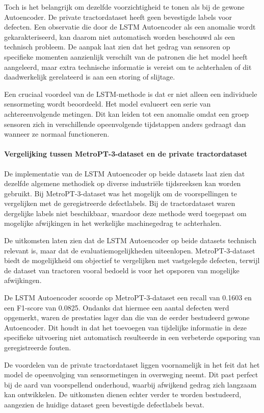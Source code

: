 {{{{Toch is het belangrijk om dezelfde voorzichtigheid te tonen als bij de gewone Autoencoder. De private tractordataset heeft geen bevestigde labels voor defecten. Een observatie die door de LSTM Autoencoder als een anomalie wordt gekarakteriseerd, kan daarom niet automatisch worden beschouwd als een technisch probleem. De aanpak laat zien dat het gedrag van sensoren op specifieke momenten aanzienlijk verschilt van de patronen die het model heeft aangeleerd, maar extra technische informatie is vereist om te achterhalen of dit daadwerkelijk gerelateerd is aan een storing of slijtage.

Een cruciaal voordeel van de LSTM-methode is dat er niet alleen een individuele sensormeting wordt beoordeeld. Het model evalueert een serie van achtereenvolgende metingen. Dit kan leiden tot een anomalie omdat een groep sensoren zich in verschillende opeenvolgende tijdstappen anders gedraagt dan wanneer ze normaal functioneren.

\paragraph{Vergelijking tussen MetroPT-3-dataset en de private tractordataset}

De implementatie van de LSTM Autoencoder op beide datasets laat zien dat dezelfde algemene methodiek op diverse industriële tijdsreeksen kan worden gebruikt. Bij MetroPT-3-dataset was het mogelijk om de voorspellingen te vergelijken met de geregistreerde defectlabels. Bij de tractordataset waren dergelijke labels niet beschikbaar, waardoor deze methode werd toegepast om mogelijke afwijkingen in het werkelijke machinegedrag te achterhalen.

De uitkomsten laten zien dat de LSTM Autoencoder op beide datasets technisch relevant is, maar dat de evaluatiemogelijkheden uiteenlopen. MetroPT-3-dataset biedt de mogelijkheid om objectief te vergelijken met vastgelegde defecten, terwijl de dataset van tractoren vooral bedoeld is voor het opsporen van mogelijke afwijkingen.

De LSTM Autoencoder scoorde op MetroPT-3-dataset een recall van 0.1603 en een F1-score van 0.0825. Ondanks dat hiermee een aantal defecten werd opgemerkt, waren de prestaties lager dan die van de eerder bestudeerd gewone Autoencoder. Dit houdt in dat het toevoegen van tijdelijke informatie in deze specifieke uitvoering niet automatisch resulteerde in een verbeterde opsporing van geregistreerde fouten.

De voordelen van de private tractordataset liggen voornamelijk in het feit dat het model de opeenvolging van sensormetingen in overweging neemt. Dit past perfect bij de aard van voorspellend onderhoud, waarbij afwijkend gedrag zich langzaam kan ontwikkelen. De uitkomsten dienen echter verder te worden bestudeerd, aangezien de huidige dataset geen bevestigde defectlabels bevat.

}}}}
